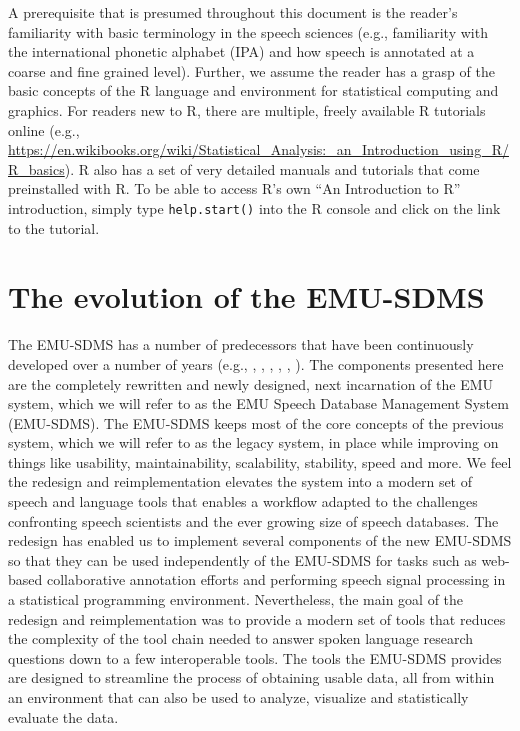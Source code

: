 \documentclass[]{book}
\begin{document}
A prerequisite that is presumed throughout this document is the reader's familiarity with basic terminology in the speech sciences (e.g., familiarity with the international phonetic alphabet (IPA) and how speech is annotated at a coarse and fine grained level). Further, we assume the reader has a grasp of the basic concepts of the R language and environment for statistical computing and graphics. For readers new to R, there are multiple, freely available R tutorials online (e.g., \url{https://en.wikibooks.org/wiki/Statistical_Analysis:_an_Introduction_using_R/R_basics}). R also has a set of very detailed manuals and tutorials that come preinstalled with R. To be able to access R's own ``An Introduction to R'' introduction, simply type \texttt{help.start()} into the R console and click on the link to the tutorial.

\hypertarget{the-evolution-of-the-emu-sdms}{%
\section{The evolution of the EMU-SDMS}\label{the-evolution-of-the-emu-sdms}}

The EMU-SDMS has a number of predecessors that have been continuously developed over a number of years (e.g., \citet{harrington:csl1993a}, \citet{cassidy:1996a}, \citet{cassidy:sc2001a}, \citet{bombien:2006a}, \citet{harrington:2010a}, \citet{john:2012a}). The components presented here are the completely rewritten and newly designed, next incarnation of the EMU system, which we will refer to as the EMU Speech Database Management System (EMU-SDMS). The EMU-SDMS keeps most of the core concepts of the previous system, which we will refer to as the legacy system, in place while improving on things like usability, maintainability, scalability, stability, speed and more. We feel the redesign and reimplementation elevates the system into a modern set of speech and language tools that enables a workflow adapted to the challenges confronting speech scientists and the ever growing size of speech databases. The redesign has enabled us to implement several components of the new EMU-SDMS so that they can be used independently of the EMU-SDMS for tasks such as web-based collaborative annotation efforts and performing speech signal processing in a statistical programming environment. Nevertheless, the main goal of the redesign and reimplementation was to provide a modern set of tools that reduces the complexity of the tool chain needed to answer spoken language research questions down to a few interoperable tools. The tools the EMU-SDMS provides are designed to streamline the process of obtaining usable data, all from within an environment that can also be used to analyze, visualize and statistically evaluate the data.
\end{document}
